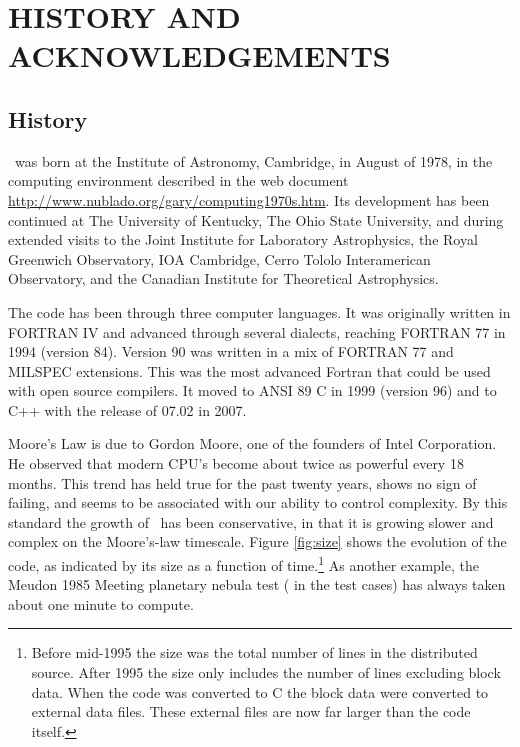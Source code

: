 \chapter{HISTORY AND ACKNOWLEDGEMENTS}

\section{History}

\Cloudy\ was born at the Institute of Astronomy, Cambridge, in August of
1978, in the computing environment described in the web document
\href{http://www.nublado.org/gary/computing1970s.htm}{http://www.nublado.org/gary/computing1970s.htm}.  Its development has been
continued at The University of Kentucky, The Ohio State University, and
during extended visits to the Joint Institute for Laboratory Astrophysics,
the Royal Greenwich Observatory, IOA Cambridge, Cerro Tololo Interamerican
Observatory, and the Canadian Institute for Theoretical Astrophysics.

The code has been through three computer languages.  It was originally
written in FORTRAN IV and advanced through several dialects,
reaching FORTRAN
77  in 1994 (version 84). Version 90 was written in a mix of FORTRAN 77
and MILSPEC extensions.  This was the most advanced Fortran that could be
used with open source compilers.  It moved to ANSI 89 C in 1999 (version
96) and to C++ with the release of 07.02 in 2007.

Moore's Law is due to Gordon Moore, one of the founders of Intel
Corporation.  He observed that modern CPU's become about twice as powerful
every 18 months.  This trend has held true for the past twenty years, shows
no sign of failing, and seems to be associated with our ability to control
complexity.  By this standard the growth of \Cloudy\ has been conservative,
in that it is growing slower and complex on the Moore's-law timescale.
Figure \ref{fig:size} shows the evolution of the code,
as indicated by its size as a
function of time.\footnote{Before mid-1995 the size was the total number of lines in the
distributed source.  After 1995 the size only includes the number of lines
excluding block data.  When the code was converted to C the block data
were converted to external data files.  These external files are now far
larger than the code itself.}
As another example, the Meudon 1985 Meeting planetary
nebula test ( in the test cases)
has always taken about one minute to compute.

